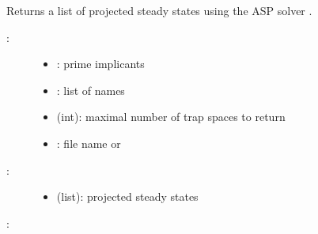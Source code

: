 \documentclass[letterpaper,10pt,english]{sphinxmanual}
\begin{document}
\begin{fulllineitems}
\label{\detokenize{AspSolver:PyBoolNet.AspSolver.steady_states_projected}}
Returns a list of projected steady states using the  ASP solver {\hyperref[\detokenize{Bibliography:gebser2011}]{}}.
\begin{description}
\item[{:}] \leavevmode\begin{itemize}
\item {} 
: prime implicants

\item {} 
: list of names

\item {} 
 (int): maximal number of trap spaces to return

\item {} 
: file name or 

\end{itemize}

\item[{:}] \leavevmode\begin{itemize}
\item {} 
 (list): projected steady states

\end{itemize}

\end{description}

:

\begin{sphinxVerbatim}[commandchars=\\\{\}]
   \PYG{p}{[}\PYG{p}{]}
\end{sphinxVerbatim}

\end{fulllineitems}
\end{document}
